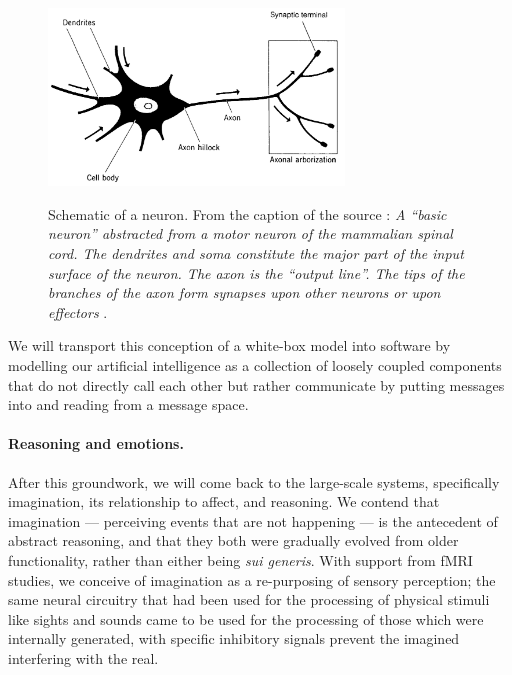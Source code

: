 \begin{figure}[t]
	\centering
	\includegraphics[width=0.7\textwidth]{Figs/neuron.png}
	\label{fig:neuron}
	\caption{Schematic of a neuron. From the caption of the source \cite[p.\ 52]{arbib1989}: \emph{A ``basic neuron'' abstracted from a motor neuron of {\upshape\lbrack}the{\upshape\rbrack} mammalian spinal cord. The dendrites and soma  constitute the major part of the input surface of the neuron. The axon is the ``output line''. The tips of the branches of the axon form synapses upon other neurons or upon effectors }.}
\end{figure}

We will transport this conception of a white-box model into software by modelling our artificial intelligence as a collection of loosely coupled components that do not directly call each other but rather communicate by putting messages into and reading from a message space.

\paragraph{Reasoning and emotions.} After this groundwork, we will come back to the large-scale systems, specifically imagination, its relationship to affect, and reasoning. We contend that imagination --- perceiving events that are not happening --- is the antecedent of abstract reasoning, and that they both were gradually evolved from older functionality, rather than either being \emph{sui generis}. With support from fMRI studies, we conceive of imagination as a re-purposing of sensory perception; the same neural circuitry that had been used for the processing of physical stimuli like sights and sounds came to be used for the processing of those which were internally generated, with specific inhibitory signals prevent the imagined interfering with the real.

